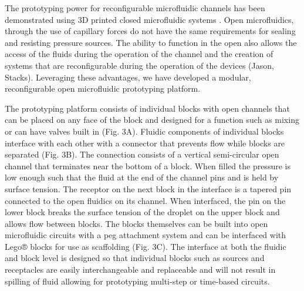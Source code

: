 The prototyping power for reconfigurable microfluidic channels has been demonstrated using 3D printed closed microfluidic systems \cite{Au2014}. Open microfluidics, through the use of capillary forces do not have the same requirements for sealing and resisting pressure sources. The ability to function in the open also allows the access of the fluids during the operation of the channel and the creation of systems that are reconfigurable during the operation of the devices (Jason, Stacks). Leveraging these advantages, we have developed a modular, reconfigurable open microfluidic prototyping platform.

The prototyping platform consists of individual blocks with open channels that can be placed on any face of the block and designed for a function such as mixing or can have valves built in (Fig. 3A). Fluidic components of individual blocks interface with each other with a connector that prevents flow while blocks are separated (Fig. 3B). The connection consists of a vertical semi-circular open channel that terminates near the bottom of a block. When filled the pressure is low enough such that the fluid at the end of the channel pins and is held by surface tension. The receptor on the next block in the interface is a tapered pin connected to the open fluidics on its channel. When interfaced, the pin on the lower block breaks the surface tension of the droplet on the upper block and allows flow between blocks. The blocks themselves can be built into open microfluidic circuits with a peg attachment system and can be interfaced with Lego® blocks for use as scaffolding (Fig. 3C). The interface at both the fluidic and block level is designed so that individual blocks such as sources and receptacles are easily interchangeable and replaceable and will not result in spilling of fluid allowing for prototyping multi-step or time-based circuits.





